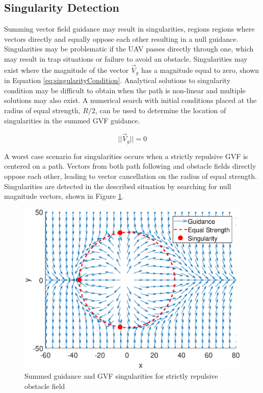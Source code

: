 \documentclass[conf]{new-aiaa}
\begin{document}
\subsection{Singularity Detection}
Summing vector field guidance may result in singularities, regions regions where vectors directly and equally oppose each other resulting in a null guidance. Singularities may be problematic if the UAV passes directly through one, which may result in trap situations or failure to avoid an obstacle. Singularities may exist where the magnitude of the vector $\overrightarrow{V}_g$ has a magnitude equal to zero, shown in Equation \ref{eq:singularityCondition}. Analytical solutions to singularity condition may be difficult to obtain when the path is non-linear and multiple solutions may also exist. A numerical search with initial conditions placed at the radius of equal strength, $R/2$, can be used to determine the location of singularities in the summed GVF guidance. 


 \begin{equation}
\label{eq:singularityCondition}
||\overrightarrow{V}_g || = 0
\end{equation}

A worst case scenario for singularities occurs when a strictly repulsive GVF is centered on a path. Vectors from both path following and obstacle fields directly oppose each other, leading to vector cancellation on the radius of equal strength. Singularities are detected in the described situation by searching for null magnitude vectors, shown in Figure \ref{fig:singularity-example}. 

\begin{figure}[H]
	\centering
	\includegraphics[trim=0 10 0 30, clip,width=12cm]{Figures/methods/singularityexample}
	\caption{Summed guidance and GVF singularities for strictly repulsive obstacle field}
	\label{fig:singularity-example}
\end{figure}
\end{document}
